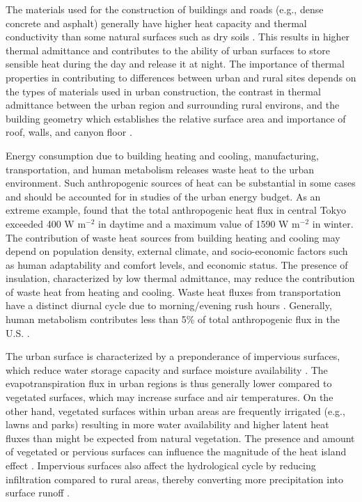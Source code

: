 \documentclass[12pt,authoryear]{elsarticle}
\numberwithin{equation}{section} %
\begin{document}
The materials used for the construction of buildings and roads (e.g., dense concrete and asphalt) generally have higher heat capacity and thermal conductivity than some natural surfaces such as dry soils \citep{okeBoundaryLayerClimates1987}. This results in higher thermal admittance and contributes to the ability of urban surfaces to store sensible heat during the day and release it at night. The importance of thermal properties in contributing to differences between urban and rural sites depends on the types of materials used in urban construction, the contrast in thermal admittance between the urban region and surrounding rural environs, and the building geometry which establishes the relative surface area and importance of roof, walls, and canyon floor \citep{okeSimulationSurfaceUrban1991}.

Energy consumption due to building heating and cooling, manufacturing, transportation, and human metabolism releases waste heat to the urban environment. Such anthropogenic sources of heat can be substantial in some cases and should be accounted for in studies of the urban energy budget. As an extreme example, \citet{ichinoseImpactAnthropogenicHeat1999} found that the total anthropogenic heat flux in central Tokyo exceeded 400 W m$^{-2}$ in daytime and a maximum value of 1590 W m$^{-2}$ in winter. The contribution of waste heat sources from building heating and cooling may depend on population density, external climate, and socio-economic factors such as human adaptability and comfort levels, and economic status. The presence of insulation, characterized by low thermal admittance, may reduce the contribution of waste heat from heating and cooling. Waste heat fluxes from transportation have a distinct diurnal cycle due to morning/evening rush hours \citep{sailorTopMethodologyDeveloping2004}. Generally, human metabolism contributes less than 5\% of total anthropogenic flux in the U.S. \citep{sailorTopMethodologyDeveloping2004}.

The urban surface is characterized by a preponderance of impervious surfaces, which reduce water storage capacity and surface moisture availability \citep{okeEnergeticBasisUrban1982}. The evapotranspiration flux in urban regions is thus generally lower compared to vegetated surfaces, which may increase surface and air temperatures. On the other hand, vegetated surfaces within urban areas are frequently irrigated (e.g., lawns and parks) resulting in more water availability and higher latent heat fluxes than might be expected from natural vegetation. The presence and amount of vegetated or pervious surfaces can influence the magnitude of the heat island effect \citep{sailorSimulatedUrbanClimate1995,upmanisInfluenceGreenAreas1998,avissarPotentialEffectsVegetation1996}. Impervious surfaces also affect the hydrological cycle by reducing infiltration compared to rural areas, thereby converting more precipitation into surface runoff \citep{okeBoundaryLayerClimates1987,bonanEcologicalClimatologyConcepts2002}.
\end{document}
